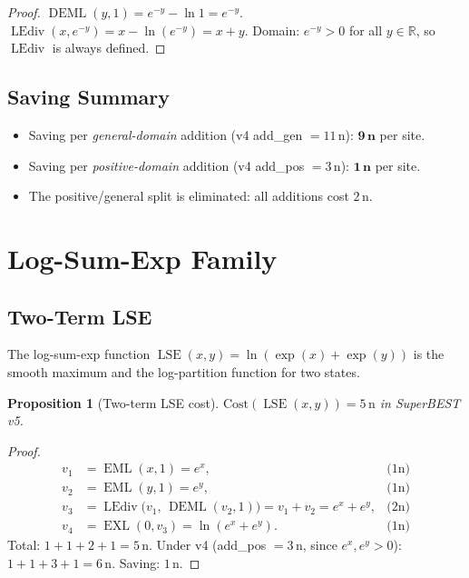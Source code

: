 \documentclass[12pt,a4paper]{article}
\newtheorem{proposition}[theorem]{Proposition}
\theoremstyle{definition}
\newcommand{\EML}{\operatorname{EML}}
\newcommand{\EXL}{\operatorname{EXL}}
\newcommand{\DEML}{\operatorname{DEML}}
\newcommand{\LEdiv}{\operatorname{LEdiv}}
\newcommand{\Cost}{\mathrm{Cost}}
\newcommand{\LSE}{\operatorname{LSE}}
\newcommand{\R}{\mathbb{R}}
\begin{document}
\begin{proof}
$\DEML(y,1) = e^{-y} - \ln 1 = e^{-y}$.
$\LEdiv(x, e^{-y}) = x - \ln(e^{-y}) = x + y$.
Domain: $e^{-y} > 0$ for all $y \in \R$, so $\LEdiv$ is always defined.
\end{proof}

\subsection{Saving Summary}

\begin{itemize}
  \item Saving per \emph{general-domain} addition (v4 add\_gen $= 11\,\text{n}$):
    $\mathbf{9\,\text{n}}$ per site.
  \item Saving per \emph{positive-domain} addition (v4 add\_pos $= 3\,\text{n}$):
    $\mathbf{1\,\text{n}}$ per site.
  \item The positive/general split is eliminated: all additions cost $2\,\text{n}$.
\end{itemize}

\section{Log-Sum-Exp Family}
\label{sec:lse}

\subsection{Two-Term LSE}

The log-sum-exp function $\LSE(x,y) = \ln(\exp(x) + \exp(y))$ is the
smooth maximum and the log-partition function for two states.

\begin{proposition}[Two-term LSE cost]
\label{prop:lse2}
$\Cost(\LSE(x,y)) = 5\,\text{n}$ in SuperBEST v5.
\end{proposition}

\begin{proof}
\begin{align*}
  v_1 &= \EML(x,1) = e^x,  & \text{(1n)} \\
  v_2 &= \EML(y,1) = e^y,  & \text{(1n)} \\
  v_3 &= \LEdiv\bigl(v_1,\,\DEML(v_2,1)\bigr) = v_1 + v_2 = e^x + e^y,  & \text{(2n)} \\
  v_4 &= \EXL(0,v_3) = \ln(e^x + e^y).  & \text{(1n)}
\end{align*}
Total: $1 + 1 + 2 + 1 = 5\,\text{n}$.  Under v4 (add\_pos $= 3\,\text{n}$, since
$e^x, e^y > 0$): $1+1+3+1 = 6\,\text{n}$.  Saving: $1\,\text{n}$.
\end{proof}
\end{document}
